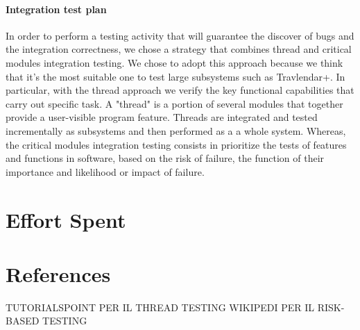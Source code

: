 \documentclass[12pt,titlepage]{article}
\begin{document}
\paragraph{Integration test plan}
In order to perform a testing activity that will guarantee the discover of bugs and the integration correctness, we chose a strategy that combines thread and critical modules integration testing. We chose to adopt this approach because we think that it's the most suitable one to test large subsystems such as Travlendar+.
In particular, with the thread approach we verify the key functional capabilities that carry out specific task. A "thread" is a portion of several modules that together provide a user-visible program feature. Threads are integrated and tested incrementally as subsystems and then performed as a a whole system.
Whereas, the critical modules integration testing consists in prioritize the tests of features and functions in software, based on the risk of failure, the function of their importance and likelihood or impact of failure. 

\section{Effort Spent}

\section{References}
TUTORIALSPOINT PER IL THREAD TESTING
WIKIPEDI PER IL RISK-BASED TESTING
\end{document}
